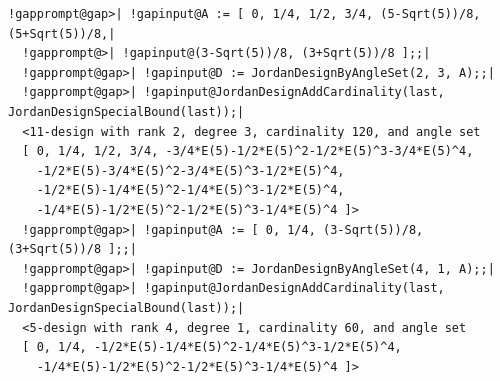 \documentclass[a4paper,11pt]{report}
\begin{document}
{{\begin{Verbatim}[commandchars=!@|,fontsize=\small,frame=single,label=Example]
  !gapprompt@gap>| !gapinput@A := [ 0, 1/4, 1/2, 3/4, (5-Sqrt(5))/8, (5+Sqrt(5))/8,|
  !gapprompt@>| !gapinput@(3-Sqrt(5))/8, (3+Sqrt(5))/8 ];;|
  !gapprompt@gap>| !gapinput@D := JordanDesignByAngleSet(2, 3, A);;|
  !gapprompt@gap>| !gapinput@JordanDesignAddCardinality(last, JordanDesignSpecialBound(last));|
  <11-design with rank 2, degree 3, cardinality 120, and angle set
  [ 0, 1/4, 1/2, 3/4, -3/4*E(5)-1/2*E(5)^2-1/2*E(5)^3-3/4*E(5)^4,
    -1/2*E(5)-3/4*E(5)^2-3/4*E(5)^3-1/2*E(5)^4,
    -1/2*E(5)-1/4*E(5)^2-1/4*E(5)^3-1/2*E(5)^4,
    -1/4*E(5)-1/2*E(5)^2-1/2*E(5)^3-1/4*E(5)^4 ]>
  !gapprompt@gap>| !gapinput@A := [ 0, 1/4, (3-Sqrt(5))/8, (3+Sqrt(5))/8 ];;|
  !gapprompt@gap>| !gapinput@D := JordanDesignByAngleSet(4, 1, A);;|
  !gapprompt@gap>| !gapinput@JordanDesignAddCardinality(last, JordanDesignSpecialBound(last));|
  <5-design with rank 4, degree 1, cardinality 60, and angle set
  [ 0, 1/4, -1/2*E(5)-1/4*E(5)^2-1/4*E(5)^3-1/2*E(5)^4,
    -1/4*E(5)-1/2*E(5)^2-1/2*E(5)^3-1/4*E(5)^4 ]>
\end{Verbatim}
 }

 }

 
\end{document}
